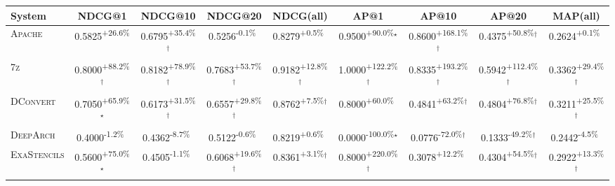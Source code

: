 \begin{table}[htbp]
\centering
\renewcommand{\arraystretch}{1.2}
\begin{tabular}{l|cccc|cccc}
\hline
System & NDCG@1 & NDCG@10 & NDCG@20 & NDCG(all) & AP@1 & AP@10 & AP@20 & MAP(all) \\ \hline
\textsc{Apache} & \cellcolor{green!30}0.5825\textsuperscript{+26.6\%}$^{\,\,\,}$ & \cellcolor{green!30}0.6795\textsuperscript{+35.4\%}$^\dagger$ & \cellcolor{red!30}0.5256\textsuperscript{-0.1\%}$^{\,\,\,}$ & \cellcolor{green!30}0.8279\textsuperscript{+0.5\%}$^{\,\,\,}$ & \cellcolor{green!30}0.9500\textsuperscript{+90.0\%}$^\star$ & \cellcolor{green!30}0.8600\textsuperscript{+168.1\%}$^\dagger$ & \cellcolor{green!30}0.4375\textsuperscript{+50.8\%}$^\dagger$ & \cellcolor{green!30}0.2624\textsuperscript{+0.1\%}$^{\,\,\,}$ \\
\textsc{7z} & \cellcolor{green!30}0.8000\textsuperscript{+88.2\%}$^\dagger$ & \cellcolor{green!30}0.8182\textsuperscript{+78.9\%}$^\dagger$ & \cellcolor{green!30}0.7683\textsuperscript{+53.7\%}$^\dagger$ & \cellcolor{green!30}0.9182\textsuperscript{+12.8\%}$^\dagger$ & \cellcolor{green!30}1.0000\textsuperscript{+122.2\%}$^\dagger$ & \cellcolor{green!30}0.8335\textsuperscript{+193.2\%}$^\dagger$ & \cellcolor{green!30}0.5942\textsuperscript{+112.4\%}$^\dagger$ & \cellcolor{green!30}0.3362\textsuperscript{+29.4\%}$^\dagger$ \\
\textsc{DConvert} & \cellcolor{green!30}0.7050\textsuperscript{+65.9\%}$^\star$ & \cellcolor{green!30}0.6173\textsuperscript{+31.5\%}$^\dagger$ & \cellcolor{green!30}0.6557\textsuperscript{+29.8\%}$^\dagger$ & \cellcolor{green!30}0.8762\textsuperscript{+7.5\%}$^\dagger$ & \cellcolor{green!30}0.8000\textsuperscript{+60.0\%}$^{\,\,\,}$ & \cellcolor{green!30}0.4841\textsuperscript{+63.2\%}$^\dagger$ & \cellcolor{green!30}0.4804\textsuperscript{+76.8\%}$^\dagger$ & \cellcolor{green!30}0.3211\textsuperscript{+25.5\%}$^\dagger$ \\
\textsc{DeepArch} & \cellcolor{red!30}0.4000\textsuperscript{-1.2\%}$^{\,\,\,}$ & \cellcolor{red!30}0.4362\textsuperscript{-8.7\%}$^{\,\,\,}$ & \cellcolor{red!30}0.5122\textsuperscript{-0.6\%}$^{\,\,\,}$ & \cellcolor{green!30}0.8219\textsuperscript{+0.6\%}$^{\,\,\,}$ & \cellcolor{red!30}0.0000\textsuperscript{-100.0\%}$^\star$ & \cellcolor{red!30}0.0776\textsuperscript{-72.0\%}$^\dagger$ & \cellcolor{red!30}0.1333\textsuperscript{-49.2\%}$^\dagger$ & \cellcolor{red!30}0.2442\textsuperscript{-4.5\%}$^{\,\,\,}$ \\
\textsc{ExaStencils} & \cellcolor{green!30}0.5600\textsuperscript{+75.0\%}$^\star$ & \cellcolor{red!30}0.4505\textsuperscript{-1.1\%}$^{\,\,\,}$ & \cellcolor{green!30}0.6068\textsuperscript{+19.6\%}$^\dagger$ & \cellcolor{green!30}0.8361\textsuperscript{+3.1\%}$^\dagger$ & \cellcolor{green!30}0.8000\textsuperscript{+220.0\%}$^\dagger$ & \cellcolor{green!30}0.3078\textsuperscript{+12.2\%}$^{\,\,\,}$ & \cellcolor{green!30}0.4304\textsuperscript{+54.5\%}$^\dagger$ & \cellcolor{green!30}0.2922\textsuperscript{+13.3\%}$^\dagger$ \\

\end{tabular}
\end{table}
